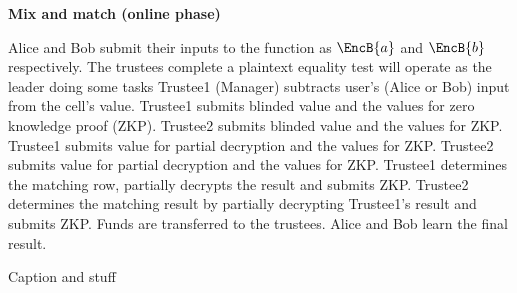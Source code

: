 

\begin{Protocol*}[t!]
\begin{framed}
\textbf{Mix and match (online phase)}\\
\footnotesize

Alice and Bob submit their inputs to the function as $\EncB{a}$ and $\EncB{b}$ respectively. The trustees complete a plaintext equality test 
 will operate as the leader doing some tasks 
 		 Trustee1 (Manager) subtracts user's (Alice or Bob) input from the cell's value.
 		 Trustee1 submits blinded value and the values for zero knowledge proof (ZKP).
 		 Trustee2 submits blinded value and the values for ZKP.
 		 Trustee1 submits value for partial decryption and the values for ZKP.
 		 Trustee2 submits value for partial decryption and the values for ZKP.
 		 Trustee1 determines the matching row, partially decrypts the result and submits ZKP.
 		 Trustee2  determines the matching result by partially decrypting Trustee1's result and submits ZKP.
 		 Funds are transferred to the trustees.
 		 Alice and Bob learn the final result.

\normalsize	
\end{framed}
\caption{Caption and stuff\label{alg:lab}}
\end{Protocol*}


